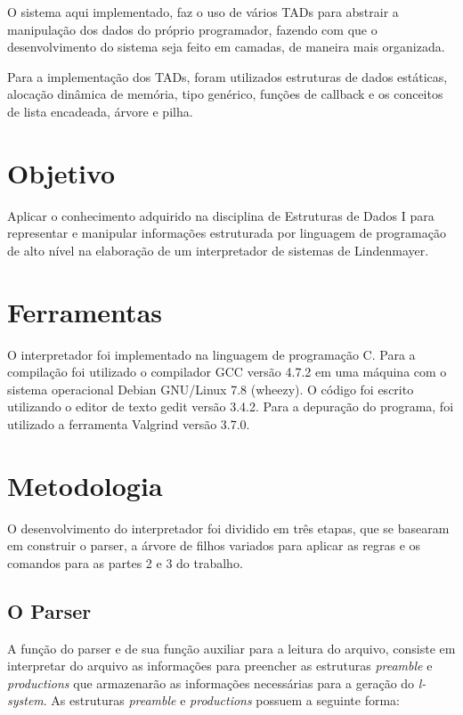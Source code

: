 \documentclass[a4paper,12pt]{article}%
\begin{document}
O sistema aqui implementado, faz o uso de vários TADs para abstrair a manipulação dos dados 
do próprio programador, fazendo com que o desenvolvimento do sistema seja feito em camadas, 
de maneira mais organizada.	

Para a implementação dos TADs, foram utilizados estruturas de dados estáticas, alocação dinâmica de memória, 
tipo genérico, funções de callback e os conceitos de lista encadeada, árvore e pilha.

\section{Objetivo}
\hspace{1.5em}Aplicar o conhecimento adquirido na disciplina de Estruturas de Dados I para representar
e manipular informações estruturada por linguagem de programação de alto nível na elaboração 
de um interpretador de sistemas de Lindenmayer.

\section{Ferramentas}
\hspace{1.5em}O interpretador foi implementado na linguagem de programação C. Para a compilação foi 
utilizado o compilador GCC versão 4.7.2 em uma máquina com o sistema operacional Debian 
GNU/Linux 7.8 (wheezy).
O código foi escrito utilizando o editor de texto gedit versão 3.4.2.
Para a depuração do programa, foi utilizado a ferramenta Valgrind versão 3.7.0.


\section{Metodologia}
\hspace{1.5em}O desenvolvimento do interpretador foi dividido em três etapas, que se basearam em construir o parser, 
a árvore de filhos variados para aplicar as regras e os comandos para as partes 2 e 3 do trabalho.

\subsection{O Parser}
	
\hspace{1.5em}A função do parser e de sua função auxiliar para a leitura do arquivo, consiste em interpretar do arquivo as 
informações para preencher as estruturas \emph{preamble} e \emph{productions} que armazenarão as informações necessárias 
para a geração do \emph{l-system}.
\newline
\newline
\hspace{1.5em}As estruturas \emph{preamble} e \emph{productions} possuem a seguinte forma:
\end{document}
